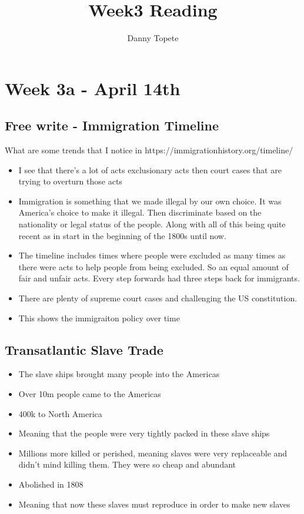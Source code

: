 \documentclass{article}
\title{Week3 Reading}
\author{Danny Topete}
\begin{document}
\maketitle

\section{Week 3a - April 14th}
\subsection{Free write - Immigration Timeline}
What are some trends that I notice in 
https://immigrationhistory.org/timeline/
\begin{itemize}
  \item I see that there's a lot of acts exclusionary acts
    then court cases that are trying to overturn those acts
  \item Immigration is something that we made illegal by our own choice.
    It was America's choice to make it illegal.
    Then discriminate based on the nationality or legal
    status of the people. Along
    with all of this being quite recent as in
    start in the beginning of the 1800s until now.
  \item The timeline includes times where people were excluded 
    as many times as there were acts to help people from being
    excluded. So an equal amount of fair and unfair acts.
    Every step forwards had three steps back for immigrants.
  \item There are plenty of supreme court cases and challenging
    the US constitution.
  \item This shows the immigraiton policy over time
\end{itemize}

\subsection{Transatlantic Slave Trade}
\begin{itemize}
  \item The slave ships brought many people into the Americas
  \item Over 10m people came to the Americas
  \item 400k to North America
  \item Meaning that the people were very tightly packed in these
    slave ships
  \item Millions more killed or perished, meaning slaves were very
    replaceable and didn't mind killing them.
    They were so cheap and abundant
  \item Abolished in 1808
  \item Meaning that now these slaves must reproduce in order to make
    new slaves
\end{itemize}
  
\end{document}
